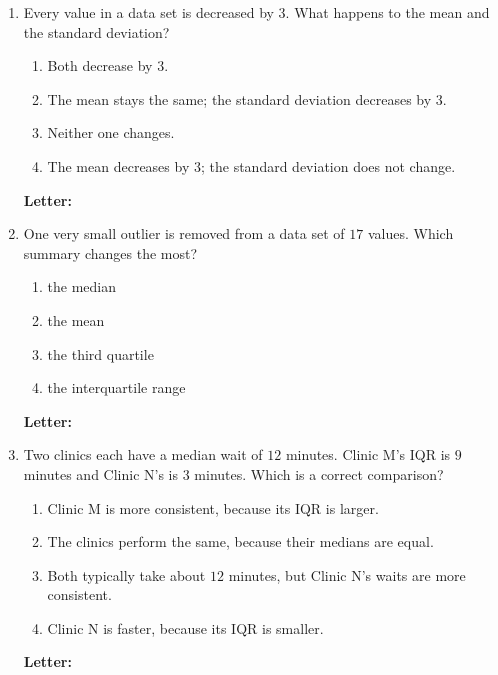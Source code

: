\documentclass[10pt]{article}
\begin{document}
\begin{enumerate}[leftmargin=2.2em, itemsep=5pt, topsep=2pt, start=6]
\boxguard[9]
\item Every value in a data set is decreased by $3$. What happens to the mean and the standard
deviation?
\begin{enumerate}[label=(\Alph*), leftmargin=1.8em, itemsep=1pt, topsep=1pt]
  \item Both decrease by $3$.
  \item The mean stays the same; the standard deviation decreases by $3$.
  \item Neither one changes.
  \item The mean decreases by $3$; the standard deviation does not change.
\end{enumerate}
\hfill \textbf{Letter:} \gradedblank[id=q9, type=choice, points=6, answer={D}]{0.9cm}{11pt}

\boxguard[9]
\item One very small outlier is removed from a data set of $17$ values. Which summary
changes the most?
\begin{enumerate}[label=(\Alph*), leftmargin=1.8em, itemsep=1pt, topsep=1pt]
  \item the median
  \item the mean
  \item the third quartile
  \item the interquartile range
\end{enumerate}
\hfill \textbf{Letter:} \gradedblank[id=q10, type=choice, points=6, answer={B}]{0.9cm}{11pt}

\boxguard[9]
\item Two clinics each have a median wait of $12$ minutes. Clinic M's IQR is $9$ minutes
and Clinic N's is $3$ minutes. Which is a correct comparison?
\begin{enumerate}[label=(\Alph*), leftmargin=1.8em, itemsep=1pt, topsep=1pt]
  \item Clinic M is more consistent, because its IQR is larger.
  \item The clinics perform the same, because their medians are equal.
  \item Both typically take about $12$ minutes, but Clinic N's waits are more consistent.
  \item Clinic N is faster, because its IQR is smaller.
\end{enumerate}
\hfill \textbf{Letter:} \gradedblank[id=q11, type=choice, points=6, answer={C}]{0.9cm}{11pt}


\end{enumerate}
\end{document}
